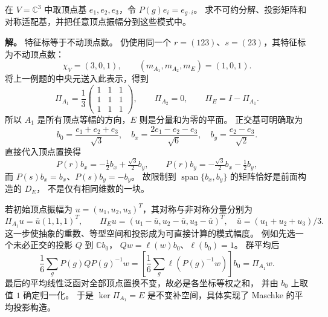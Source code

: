 \begin{workedexample}[三维顶点置换表示的实际投影与基底]
\label{ex:d3-comprehensive-permutation}
在 $V=\mathbb C^3$ 中取顶点基 $e_1,e_2,e_3$，令 $P(g)e_i=e_{g\cdot i}$。
求不可约分解、投影矩阵和对称适配基，并把任意顶点振幅分到这些模式中。

\textbf{解。} 特征标等于不动顶点数。
仍使用同一个 $r=(123)$、$s=(23)$，其特征标为不动顶点数：
\[
\chi_V=(3,0,1),\qquad
(m_{A_1},m_{A_2},m_E)=(1,0,1).
\]
将上一例题的中央元送入此表示，得到
\[
\Pi_{A_1}=\frac13
\begin{pmatrix}1&1&1\\1&1&1\\1&1&1\end{pmatrix},\qquad
\Pi_{A_2}=0,\qquad \Pi_E=I-\Pi_{A_1}.
\]
所以 $A_1$ 是所有顶点等幅的方向，$E$ 则是分量和为零的平面。
正交基可明确取为
\[
b_0=\frac{e_1+e_2+e_3}{\sqrt3},\quad
b_x=\frac{2e_1-e_2-e_3}{\sqrt6},\quad
b_y=\frac{e_2-e_3}{\sqrt2}.
\]
直接代入顶点置换得
\[
P(r)b_x=-\tfrac12 b_x+\tfrac{\sqrt3}{2}b_y,\qquad
P(r)b_y=-\tfrac{\sqrt3}{2}b_x-\tfrac12 b_y,
\]
而 $P(s)b_x=b_x$、$P(s)b_y=-b_y$。
故限制到 $\operatorname{span}\{b_x,b_y\}$ 的矩阵恰好是前面构造的 $D_E$，
不是仅有相同维数的一块。

若初始顶点振幅为 $u=(u_1,u_2,u_3)^T$，其对称与非对称分量分别为
\[
\Pi_{A_1}u=\bar u(1,1,1)^T,\qquad
\Pi_Eu=(u_1-\bar u,u_2-\bar u,u_3-\bar u)^T,
\quad \bar u=(u_1+u_2+u_3)/3.
\]
这一步使抽象的重数、等型空间和投影成为可直接计算的模式幅度。
例如先选一个未必正交的投影 $Q$ 到 $\mathbb C b_0$，
$Qw=\ell(w)b_0$、$\ell(b_0)=1$。
群平均后
\[
\frac16\sum_gP(g)QP(g)^{-1}w
=\left[\frac16\sum_g\ell(P(g)^{-1}w)\right]b_0
=\Pi_{A_1}w.
\]
最后的平均线性泛函对全部顶点置换不变，故必是各坐标等权之和，
并由 $b_0$ 上取值 $1$ 确定归一化。
于是 $\ker\Pi_{A_1}=E$ 是不变补空间，具体实现了 Maschke 的平均投影构造。
\end{workedexample}

